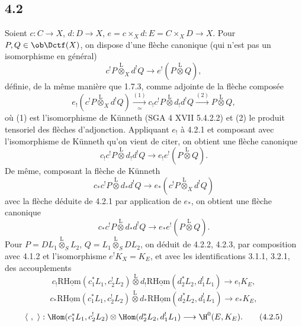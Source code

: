 \subsection*{4.2}
Soient $c:C\to X$, $d:D\to X$, $e=c\times_Xd:E=C\times_XD\to X$. Pour $P,Q\in\ob\Dctf(X)$, on dispose d'une flèche canonique (qui n'est pas un isomorphisme en général)
\begin{equation}
c^!P\overset{\mathrm{L}}{\otimes}_X d^!Q
\longrightarrow e^!(P\overset{\mathrm{L}}{\otimes}Q),
\tag{4.2.1}
\end{equation}
définie, de la
même manière que 1.7.3, comme adjointe de la flèche composée
\[
e_!(c^!P\overset{\mathrm{L}}{\otimes}_X d^!Q)
\xrightarrow[\simeq]{(1)}
 c_!c^!P\overset{\mathrm{L}}{\otimes}d_!d^!Q
\xrightarrow{(2)} P\overset{\mathrm{L}}{\otimes}Q,
\]
où (1) est l'isomorphisme de Künneth (SGA 4 XVII 5.4.2.2) et (2) le produit tensoriel des flèches d'adjonction. Appliquant $e_!$ à 4.2.1 et composant avec l'isomorphisme de Künneth qu'on vient de citer, on obtient une flèche canonique
\begin{equation}
c_!c^!P\overset{\mathrm{L}}{\otimes}d_!d^!Q
\longrightarrow e_!e^!(P\overset{\mathrm{L}}{\otimes}Q).
\tag{4.2.2}
\end{equation}
De même, composant la flèche de Künneth
\[
c_*c^!P\overset{\mathrm{L}}{\otimes}d_*d^!Q
\longrightarrow e_*(c^!P\overset{\mathrm{L}}{\otimes}_X d^!Q)
\]
avec la flèche déduite de 4.2.1 par application de $e_*$, on obtient une flèche canonique
\begin{equation}
c_*c^!P\overset{\mathrm{L}}{\otimes}d_*d^!Q
\longrightarrow e_*e^!(P\overset{\mathrm{L}}{\otimes}Q).
\tag{4.2.3}
\end{equation}
Pour $P=DL_1\overset{\mathrm{L}}{\otimes}_S L_2$, $Q=L_1\overset{\mathrm{L}}{\otimes}_S DL_2$, on déduit de 4.2.2, 4.2.3, par composition avec 4.1.2 et l'isomorphisme $e^!K_X=K_E$, et avec les identifications 3.1.1, 3.2.1, des accouplements
\begin{equation}
c_!\mathrm{R}\underline{\mathrm{Hom}}(c_1^*L_1,c_2^!L_2)\overset{\mathrm{L}}{\otimes}
 d_!\mathrm{R}\underline{\mathrm{Hom}}(d_2^*L_2,d_1^!L_1)
\longrightarrow e_!K_E,
\tag{4.2.4}
\end{equation}
\begin{equation}
c_*\mathrm{R}\underline{\mathrm{Hom}}(c_1^*L_1,c_2^!L_2)\overset{\mathrm{L}}{\otimes}
 d_*\mathrm{R}\underline{\mathrm{Hom}}(d_2^*L_2,d_1^!L_1)
\longrightarrow e_*K_E,
\tag*{(4.2.4)'}
\end{equation}
\begin{equation}
\langle\ ,\ \rangle:
\Hom(c_1^*L_1,c_2^!L_2)\otimes\Hom(d_2^*L_2,d_1^!L_1)
\longrightarrow \H^0(E,K_E).
\tag{4.2.5}
\end{equation}

